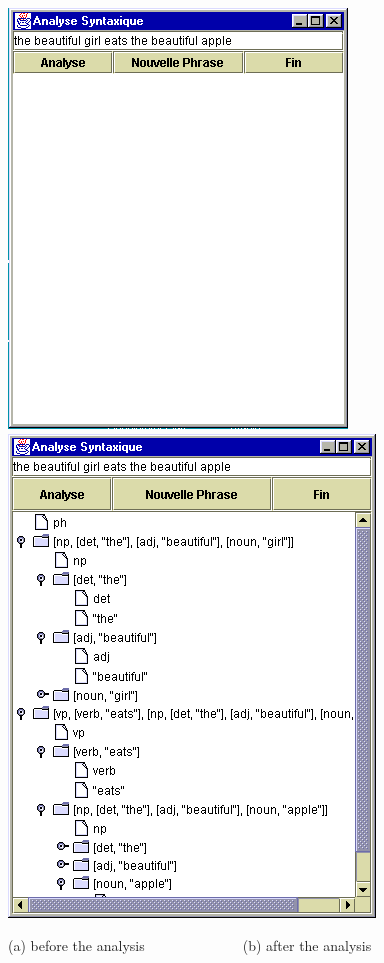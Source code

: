 \documentclass{book}
\begin{document}
\begin{latexonly}

\begin{figure}
\begin{center}
\includegraphics[scale=0.4]{AnalSynt1.png}
\includegraphics[scale=0.4]{AnalSynt2.png}
\end{center}
\caption{\label{AnalySynt12}(a) before the analysis~~~~~~~~~~~~~~(b)
after the analysis}
\end{figure}

\end{latexonly}
\end{document}
